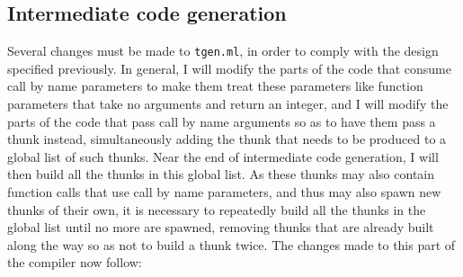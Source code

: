 \documentclass[a4paper,10pt]{article}
\begin{document}
\subsection{Intermediate code generation}
Several changes must be made to \texttt{tgen.ml}, in order to comply with the design specified previously. In general, I will modify the parts of the code that consume call by name parameters to make them treat these parameters like function parameters that take no arguments and return an integer, and I will modify the parts of the code that pass call by name arguments so as to have them pass a thunk instead, simultaneously adding the thunk that needs to be produced to a global list of such thunks. Near the end of intermediate code generation, I will then build all the thunks in this global list. As these thunks may also contain function calls that use call by name parameters, and thus may also spawn new thunks of their own, it is necessary to repeatedly build all the thunks in the global list until no more are spawned, removing thunks that are already built along the way so as not to build a thunk twice. The changes made to this part of the compiler now follow:
\end{document}
